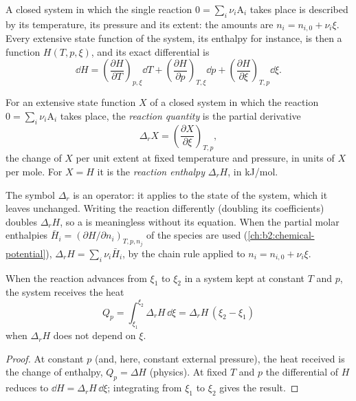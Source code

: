 A closed system in which the single reaction $0 = \sum_i\nu_i\mathrm A_i$
takes place is described by its temperature, its pressure and its extent:
the amounts are $n_i = n_{i,0} + \nu_i\xi$. Every extensive state function
of the system, its enthalpy for instance, is then a function $H(T, p,
\xi)$, and its exact differential is
\[
  \dd H = \left(\frac{\partial H}{\partial T}\right)_{p,\xi}\dd T
        + \left(\frac{\partial H}{\partial p}\right)_{T,\xi}\dd p
        + \left(\frac{\partial H}{\partial \xi}\right)_{T,p}\dd\xi .
\]

\begin{definition}\label{def:b2:reaction-enthalpy:reaction-quantity}
For an extensive state function $X$ of a closed system in which the
reaction $0 = \sum_i\nu_i\mathrm A_i$ takes place, the \emph{reaction
quantity} is the partial derivative
\[
  \Delta_r X = \left(\frac{\partial X}{\partial \xi}\right)_{T,p} ,
\]
the change of $X$ per unit extent at fixed temperature and pressure, in
units of $X$ per mole. For $X = H$ it is the \emph{reaction
enthalpy} $\Delta_r H$, in \unit{kJ/mol}.
\end{definition}

\begin{remark}\label{rem:b2:reaction-enthalpy:operator}
The symbol $\Delta_r$ is an operator: it applies to the state of the
system, which it leaves unchanged. Writing the reaction differently
(doubling its coefficients) doubles $\Delta_r H$, so a  is
meaningless without its equation. When the partial molar enthalpies
$\bar H_i = (\partial H/\partial n_i)_{T,p,n_j}$ of the species are used
(\cref{ch:b2:chemical-potential}), $\Delta_r H = \sum_i\nu_i\bar H_i$, by
the chain rule applied to $n_i = n_{i,0} + \nu_i\xi$.
\end{remark}

\begin{proposition}\label{prop:b2:reaction-enthalpy:qp}
When the reaction advances from $\xi_1$ to $\xi_2$ in a system kept at
constant $T$ and $p$, the system receives the heat
\[
  Q_p = \int_{\xi_1}^{\xi_2}\Delta_r H\,\dd\xi = \Delta_r H\,(\xi_2 - \xi_1)
\]
when $\Delta_r H$ does not depend on $\xi$.
\end{proposition}

\begin{proof}
At constant $p$ (and, here, constant external pressure), the heat received
is the change of enthalpy, $Q_p = \Delta H$ (physics). At fixed $T$ and $p$
the differential of $H$ reduces to $\dd H = \Delta_r H\,\dd\xi$; integrating
from $\xi_1$ to $\xi_2$ gives the result.
\end{proof}

